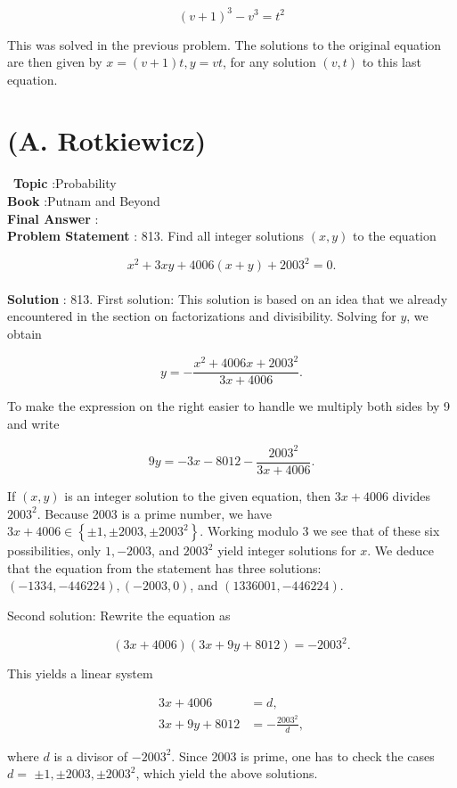 \documentclass[10pt]{article}
\begin{document}
$$
(v+1)^{3}-v^{3}=t^{2}
$$

This was solved in the previous problem. The solutions to the original equation are then given by $x=(v+1) t, y=v t$, for any solution $(v, t)$ to this last equation.

\section{(A. Rotkiewicz)}\
\textbf{Topic} :Probability\\
\textbf{Book} :Putnam and Beyond\\
\textbf{Final Answer} :\\


\textbf{Problem Statement} :
813. Find all integer solutions $(x, y)$ to the equation

$$
x^{2}+3 x y+4006(x+y)+2003^{2}=0 .
$$
\\
\textbf{Solution} :
813. First solution: This solution is based on an idea that we already encountered in the section on factorizations and divisibility. Solving for $y$, we obtain

$$
y=-\frac{x^{2}+4006 x+2003^{2}}{3 x+4006} .
$$

To make the expression on the right easier to handle we multiply both sides by 9 and write

$$
9 y=-3 x-8012-\frac{2003^{2}}{3 x+4006} .
$$

If $(x, y)$ is an integer solution to the given equation, then $3 x+4006$ divides $2003^{2}$. Because 2003 is a prime number, we have $3 x+4006 \in\left\{\pm 1, \pm 2003, \pm 2003^{2}\right\}$. Working modulo 3 we see that of these six possibilities, only $1,-2003$, and $2003^{2}$ yield integer solutions for $x$. We deduce that the equation from the statement has three solutions: $(-1334,-446224),(-2003,0)$, and $(1336001,-446224)$.

Second solution: Rewrite the equation as

$$
(3 x+4006)(3 x+9 y+8012)=-2003^{2} .
$$

This yields a linear system

$$
\begin{aligned}
3 x+4006 &=d, \\
3 x+9 y+8012 &=-\frac{2003^{2}}{d},
\end{aligned}
$$

where $d$ is a divisor of $-2003^{2}$. Since 2003 is prime, one has to check the cases $d=$ $\pm 1, \pm 2003, \pm 2003^{2}$, which yield the above solutions.
\end{document}
